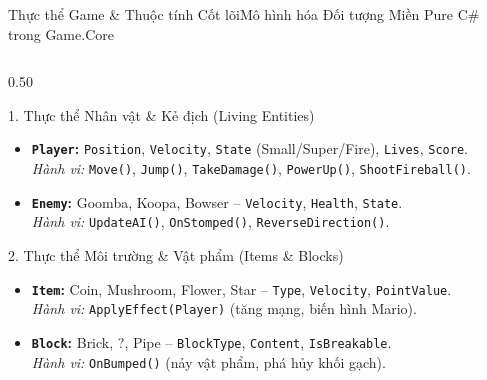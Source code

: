 \documentclass[aspectratio=169, 10pt]{beamer}
\begin{document}
\begin{frame}{Thực thể Game \& Thuộc tính Cốt lõi}{Mô hình hóa Đối tượng Miền Pure C\# trong Game.Core}
    \begin{columns}[T]
        \begin{column}{0.50\textwidth}
            \begin{coreCard}[top=1pt, bottom=1pt]{1. Thực thể Nhân vật \& Kẻ địch (Living Entities)}
                \begin{itemize}\scriptsize\setlength{\itemsep}{0.2pt}
                    \item \textbf{\texttt{Player}:} \texttt{Position}, \texttt{Velocity}, \texttt{State} (Small/Super/Fire), \texttt{Lives}, \texttt{Score}. \\
                    \textit{Hành vi:} \texttt{Move()}, \texttt{Jump()}, \texttt{TakeDamage()}, \texttt{PowerUp()}, \texttt{ShootFireball()}.
                    \item \textbf{\texttt{Enemy}:} Goomba, Koopa, Bowser -- \texttt{Velocity}, \texttt{Health}, \texttt{State}. \\
                    \textit{Hành vi:} \texttt{UpdateAI()}, \texttt{OnStomped()}, \texttt{ReverseDirection()}.
                \end{itemize}
            \end{coreCard}

            \vspace{-0.18cm}
            \begin{infoCard}[top=1pt, bottom=1pt]{2. Thực thể Môi trường \& Vật phẩm (Items \& Blocks)}
                \begin{itemize}\scriptsize\setlength{\itemsep}{0.2pt}
                    \item \textbf{\texttt{Item}:} Coin, Mushroom, Flower, Star -- \texttt{Type}, \texttt{Velocity}, \texttt{PointValue}. \\
                    \textit{Hành vi:} \texttt{ApplyEffect(Player)} (tăng mạng, biến hình Mario).
                    \item \textbf{\texttt{Block}:} Brick, ?, Pipe -- \texttt{BlockType}, \texttt{Content}, \texttt{IsBreakable}. \\
                    \textit{Hành vi:} \texttt{OnBumped()} (nảy vật phẩm, phá hủy khối gạch).
                \end{itemize}
            \end{infoCard}
        \end{column}


\end{columns}
\end{frame}
\end{document}
